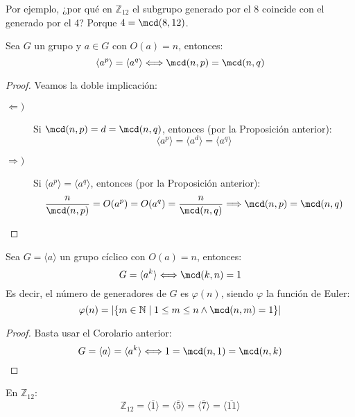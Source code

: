 \begin{ejemplo}
    Por ejemplo, ¿por qué en $\mathbb{Z}_{12}$ el subgrupo generado por el 8 coincide con el generado por el 4? Porque $4 = \mcd(8,12)$.
\end{ejemplo}

\begin{coro}
    Sea $G$ un grupo y $a\in G$ con $O(a) = n$, entonces:
    \begin{equation*}
        \langle a^p \rangle  = \langle a^q \rangle  \Longleftrightarrow \mcd(n,p) = \mcd(n,q)
    \end{equation*}
    \begin{proof}
        Veamos la doble implicación:
        \begin{description}
            \item [$\Longleftarrow)$] Si $\mcd(n,p) = d = \mcd(n,q)$, entonces (por la Proposición anterior):
                \begin{equation*}
                    \langle a^p \rangle  = \langle a^d \rangle  = \langle a^q \rangle 
                \end{equation*}
            \item [$\Longrightarrow)$] Si $\langle a^p \rangle = \langle a^q \rangle $, entonces (por la Proposición anterior):
                \begin{equation*}
                    \dfrac{n}{\mcd(n,p)} = O(a^p) = O(a^q) = \dfrac{n}{\mcd(n,q)} \Longrightarrow \mcd(n,p) = \mcd(n,q)
                \end{equation*}
        \end{description}
    \end{proof}
\end{coro}

\begin{coro}
    Sea $G = \langle a \rangle $ un grupo cíclico con $O(a) = n$, entonces:
    \begin{equation*}
        G = \langle a^k \rangle  \Longleftrightarrow \mcd(k,n) = 1
    \end{equation*}
    Es decir, el número de generadores de $G$ es $\varphi(n)$, siendo $\varphi$ la función de Euler:
    \begin{equation*}
        \varphi(n) = |\{m\in \mathbb{N} \mid 1\leq m\leq n \land \mcd(n,m)=1\}|
    \end{equation*}
    \begin{proof}
        Basta usar el Corolario anterior:
        \begin{equation*}
            G = \langle a \rangle = \langle a^k \rangle \Longleftrightarrow 1 = \mcd(n,1) = \mcd(n,k) 
        \end{equation*}
    \end{proof}
\end{coro}

\begin{ejemplo}
    En $\mathbb{Z}_{12}$:
    \begin{equation*}
        \mathbb{Z}_{12} = \langle \overline{1} \rangle  = \langle \overline{5} \rangle  = \langle \overline{7} \rangle  = \langle \overline{11} \rangle 
    \end{equation*}
\end{ejemplo}
